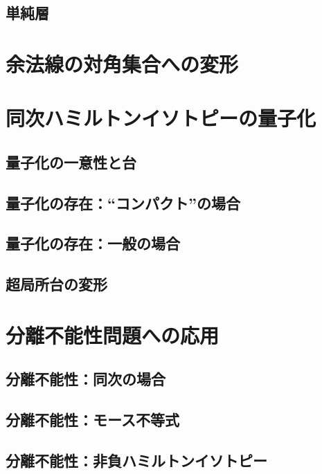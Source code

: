 \subsection{単純層{\cite[7.5節]{KS90}}}

\section{余法線の対角集合への変形}

\section{同次ハミルトンイソトピーの量子化}

\subsection{量子化の一意性と台}

\subsection{量子化の存在：``コンパクト''の場合}

\subsection{量子化の存在：一般の場合}

\subsection{超局所台の変形}

\section{分離不能性問題への応用}

\subsection{分離不能性：同次の場合}

\subsection{分離不能性：モース不等式}

\subsection{分離不能性：非負ハミルトンイソトピー}

